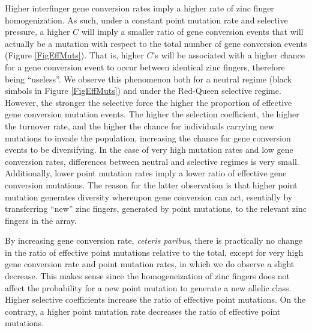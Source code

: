 \documentclass[a4paper,10pt]{article}
\begin{document}
Higher interfinger gene conversion rates imply a higher rate of zinc finger homogenization. As such, under a constant point mutation rate and selective pressure, a higher $C$ will imply a smaller ratio of gene conversion events that will actually be a mutation with respect to the total number of gene conversion events (Figure \ref{FigEffMuts}). That is, higher $C$'s will be associated with a higher chance for a gene conversion event to occur between identical zinc fingers, therefore being ``useless''. We observe this phenomenon both for a neutral regime (black simbols in Figure \ref{FigEffMuts}) and under the Red-Queen selective regime. However, the stronger the selective force the higher the proportion of effective gene conversion mutation events. The higher the selection coefficient, the higher the turnover rate, and the higher the chance for individuals carrying new mutations to invade the population, increasing the chance for gene conversion events to be diversifying. In the case of very high mutation rates and low gene conversion rates, differences between neutral and selective regimes is very small. Additionally, lower point mutation rates imply a lower ratio of effective gene conversion mutations. The reason for the latter observation is that higher point mutation generates diversity whereupon gene conversion can act, esentially by transferring ``new'' zinc fingers, generated by point mutations, to the relevant zinc fingers in the array. 

By increasing gene conversion rate, \textit{ceteris paribus}, there is practically no change in the ratio of effective point mutations relative to the total, except for very high gene conversion rate and point mutation rates, in which we do observe a slight decrease. This makes sense since the homogeneization of zinc fingers does not affect the probability for a new point mutation to generate a new allelic class. Higher selective coefficients increase the ratio of effective point mutations. %
On the contrary, a higher point mutation rate decreases the ratio of effective point mutations. 
\end{document}
